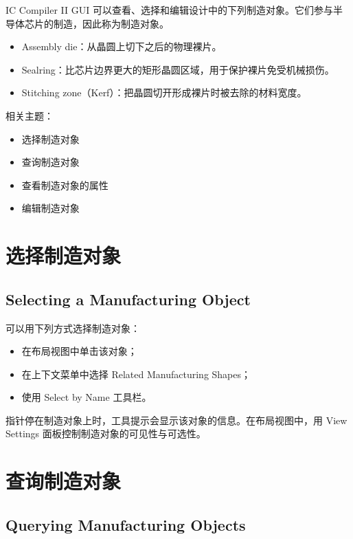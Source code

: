 \label{chap:gui-mfg}

IC Compiler II GUI 可以查看、选择和编辑设计中的下列制造对象。它们参与半导体芯片的制造，因此称为制造对象。
\begin{itemize}
  \item Assembly die：从晶圆上切下之后的物理裸片。
  \item Sealring：比芯片边界更大的矩形晶圆区域，用于保护裸片免受机械损伤。
  \item Stitching zone（Kerf）：把晶圆切开形成裸片时被去除的材料宽度。
\end{itemize}

相关主题：
\begin{itemize}
  \item 选择制造对象
  \item 查询制造对象
  \item 查看制造对象的属性
  \item 编辑制造对象
\end{itemize}

\section{选择制造对象}
\subsection*{Selecting a Manufacturing Object}

可以用下列方式选择制造对象：
\begin{itemize}
  \item 在布局视图中单击该对象；
  \item 在上下文菜单中选择 Related Manufacturing Shapes；
  \item 使用 Select by Name 工具栏。
\end{itemize}

指针停在制造对象上时，工具提示会显示该对象的信息。在布局视图中，用 View Settings 面板控制制造对象的可见性与可选性。

\section{查询制造对象}
\subsection*{Querying Manufacturing Objects}

